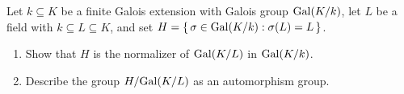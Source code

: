 \begin{problem}
  Let \(k\subseteq K\) be a finite Galois extension with Galois group
  \(\operatorname{Gal}(K/k)\), let \(L\) be a field with \( k\subseteq L\subseteq K\),
  and set \(H=\left\{\,\sigma\in\operatorname{Gal}(K/k):\sigma(L)=L\,\right\}\).
  \begin{enumerate}[label=(\alph*)]
  \item Show that \(H\) is the normalizer of \(\operatorname{Gal}(K/L)\) in
    \(\operatorname{Gal}(K/k)\).
  \item Describe the group \(H/{\operatorname{Gal}(K/L)}\) as an automorphism group.
  \end{enumerate}
\end{problem}
\begin{solution}
\end{solution}

